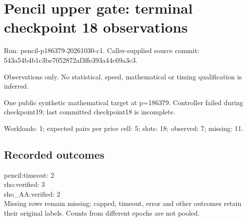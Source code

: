 \documentclass[10pt]{article}
\begin{document}
\raggedright\sloppy\section*{Pencil upper gate: terminal checkpoint 18 observations}
Run: pencil-p186379-20261030-c1. Caller-supplied source commit: 543a54b4b1c3be7052872af3ffe393a44c69a3c3.\par
Observations only. No statistical, speed, mathematical or timing qualification is inferred.\par
One public synthetic mathematical target at p=186379. Controller failed during checkpoint19; last committed checkpoint18 is incomplete.\par Workloads: 1; expected pairs per price cell: 5; slots: 18; observed: 7; missing: 11.\par
\subsection*{Recorded outcomes}
pencil:timeout: 2\\
rho:verified: 3\\
rho\_AA:verified: 2\\
 Missing rows remain missing; capped, timeout, error and other outcomes retain their original labels. Counts from different epochs are not pooled.\par
\end{document}
